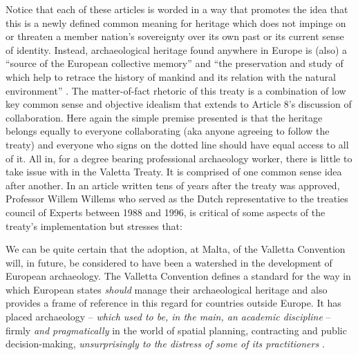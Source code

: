Notice that each of these articles is worded in a way that promotes the idea that this is a newly defined common meaning for heritage which does not impinge on or threaten a member nation’s sovereignty over its own past or its current sense of identity. Instead, archaeological heritage found anywhere in Europe is (also) a “source of the European collective memory” and “the preservation and study of which help to retrace the history of mankind and its relation with the natural environment” \parencite[4]{Valetta_1992}. 
The matter-of-fact rhetoric of this treaty is a combination of low key common sense and objective idealism that extends to Article 8’s discussion of collaboration. Here again the simple premise presented is that the heritage belongs equally to everyone collaborating (aka anyone agreeing to follow the treaty) and everyone who signs on the dotted line should have equal access to all of it. All in, for a degree bearing professional archaeology worker, there is little to take issue with in the Valetta Treaty. It is comprised of one common sense idea after another. In an article written tens of years after the treaty was approved, Professor Willem Willems who served as the Dutch representative to the treaties council of Experts between 1988 and 1996, is critical of some aspects of the treaty’s implementation but stresses that:

\begin{displayquote}
	We can be quite certain that the adoption, at Malta, of the Valletta Convention will, in future, be considered to have been a watershed in the development of European archaeology. The Valletta Convention defines a standard for the way in which European states \textit{should} manage their archaeological heritage and also provides a frame of reference in this regard for countries outside Europe. It has placed archaeology – \textit{which used to be, in the main, an academic discipline} – firmly {\textit{and pragmatically}} in the world of spatial planning, contracting and public decision-making, \textit{unsurprisingly to the distress of some of its practitioners} \parencite{Willems_2007}.
\end{displayquote}

